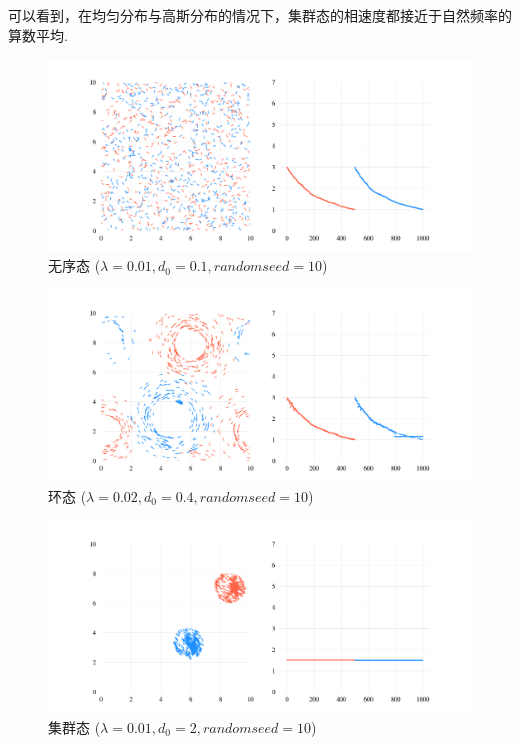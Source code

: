 \documentclass{article}
\begin{document}
\vspace{-0.5cm}

可以看到，在均匀分布与高斯分布的情况下，集群态的相速度都接近于自然频率的算数平均.

\begin{figure}[H]
	\centering
	\includegraphics[width=\textwidth]{./figs/CorrectCoupling_uniform_0.010_0.10_10_radius.png}
	\vspace{-1cm}
	\caption{无序态 ($\lambda=0.01, d_0=0.1, random seed=10$)}
	\label{fig:fig22.1}
\end{figure}

\vspace{-1cm}

\begin{figure}[H]
	\centering
	\includegraphics[width=\textwidth]{./figs/CorrectCoupling_uniform_0.020_0.40_10_radius.png}
	\vspace{-1cm}
	\caption{环态 ($\lambda=0.02, d_0=0.4, random seed=10$)}
	\label{fig:fig22.2}
\end{figure}

\vspace{-1cm}

\begin{figure}[H]
	\centering
	\includegraphics[width=\textwidth]{./figs/CorrectCoupling_uniform_0.010_2.00_10_radius.png}
	\vspace{-1cm}
	\caption{集群态 ($\lambda=0.01, d_0=2, random seed=10$)}
	\label{fig:fig22.3}
\end{figure}
\end{document}
